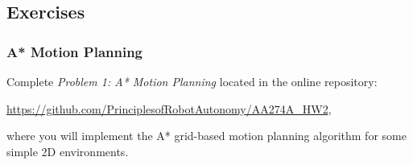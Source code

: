 \subsection{Exercises}
\subsubsection{A* Motion Planning}
Complete \textit{Problem 1: A* Motion Planning} located in the online repository:

\vspace{\baselineskip}

\url{https://github.com/PrinciplesofRobotAutonomy/AA274A_HW2},

\vspace{\baselineskip}

where you will implement the A* grid-based motion planning algorithm for some simple 2D environments.
